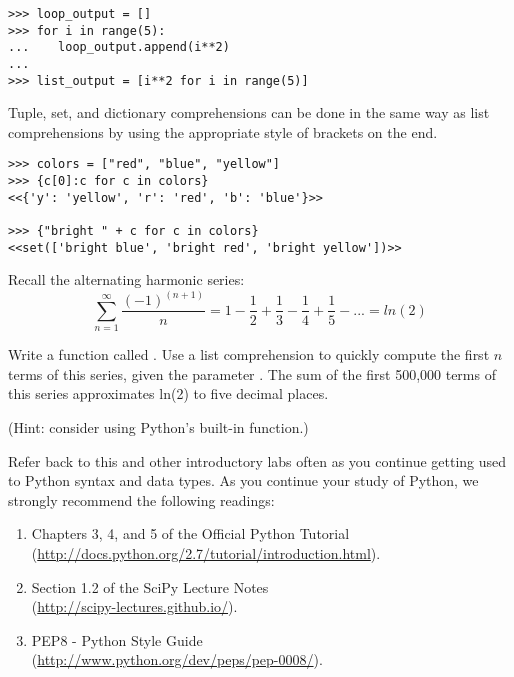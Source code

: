 \begin{lstlisting}
>>> loop_output = []
>>> for i in range(5):
...    loop_output.append(i**2)
...
>>> list_output = [i**2 for i in range(5)]
\end{lstlisting}

Tuple, set, and dictionary comprehensions can be done in the same way as list comprehensions by using the appropriate style of brackets on the end.

\begin{lstlisting}
>>> colors = ["red", "blue", "yellow"]
>>> {c[0]:c for c in colors}
<<{'y': 'yellow', 'r': 'red', 'b': 'blue'}>>

>>> {"bright " + c for c in colors}
<<set(['bright blue', 'bright red', 'bright yellow'])>>
\end{lstlisting}

\begin{problem}
Recall the alternating harmonic series:
\[\sum_{n=1}^\infty \frac{(-1)^{(n+1)}}{n} = 1 - \frac{1}{2} + \frac{1}{3} - \frac{1}{4} + \frac{1}{5} - ... = ln(2)\]

Write a function called .
Use a list comprehension to quickly compute the first $n$ terms of this series, given the parameter .
The sum of the first 500,000 terms of this series approximates ln(2) to five decimal places.

(Hint: consider using Python's built-in  function.)
\end{problem}

Refer back to this and other introductory labs often as you continue getting used to Python syntax and data types.
As you continue your study of Python, we strongly recommend the following readings:
\begin{enumerate}
\item Chapters 3, 4, and 5 of the Official Python Tutorial \\
        (\url{http://docs.python.org/2.7/tutorial/introduction.html}).
\item Section 1.2 of the SciPy Lecture Notes\\
        (\url{http://scipy-lectures.github.io/}).
\item PEP8 - Python Style Guide \\
        (\url{http://www.python.org/dev/peps/pep-0008/}).
\end{enumerate}
